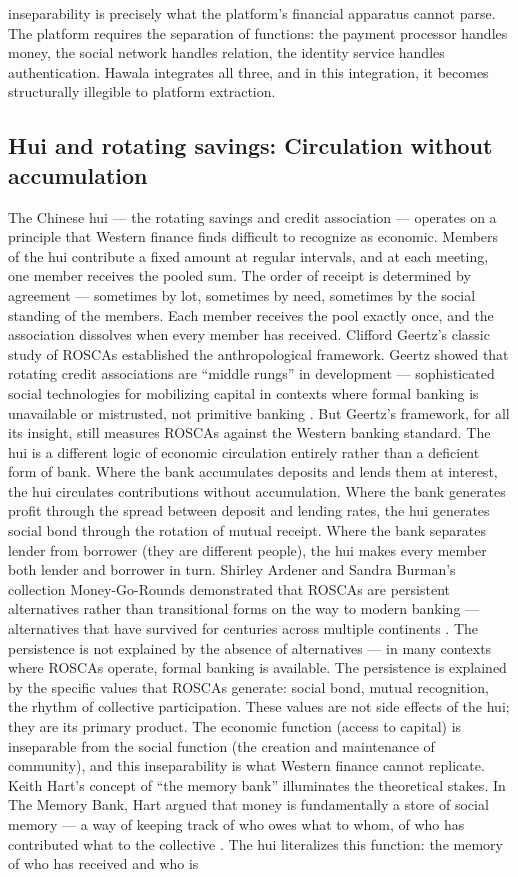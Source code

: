 inseparability is precisely what the platform’s financial apparatus cannot parse. The platform requires the separation of functions: the payment processor handles money, the social network handles relation, the identity service handles authentication. Hawala integrates all three, and in this integration, it becomes structurally illegible to platform extraction.

\subsection{Hui and rotating savings: Circulation without accumulation}

The Chinese hui — the rotating savings and credit association — operates on a principle that Western finance finds difficult to recognize as economic. Members of the hui contribute a fixed amount at regular intervals, and at each meeting, one member receives the pooled sum. The order of receipt is determined by agreement — sometimes by lot, sometimes by need, sometimes by the social standing of the members. Each member receives the pool exactly once, and the association dissolves when every member has received. Clifford Geertz’s classic study of ROSCAs established the anthropological framework. Geertz showed that rotating credit associations are “middle rungs” in development — sophisticated social technologies for mobilizing capital in contexts where formal banking is unavailable or mistrusted, not primitive banking \cite{geertz_1962}. But Geertz’s framework, for all its insight, still measures ROSCAs against the Western banking standard. The hui is a different logic of economic circulation entirely rather than a deficient form of bank. Where the bank accumulates deposits and lends them at interest, the hui circulates contributions without accumulation. Where the bank generates profit through the spread between deposit and lending rates, the hui generates social bond through the rotation of mutual receipt. Where the bank separates lender from borrower (they are different people), the hui makes every member both lender and borrower in turn. Shirley Ardener and Sandra Burman’s collection Money-Go-Rounds demonstrated that ROSCAs are persistent alternatives rather than transitional forms on the way to modern banking — alternatives that have survived for centuries across multiple continents \cite{ardener_burman_1995}. The persistence is not explained by the absence of alternatives — in many contexts where ROSCAs operate, formal banking is available. The persistence is explained by the specific values that ROSCAs generate: social bond, mutual recognition, the rhythm of collective participation. These values are not side effects of the hui; they are its primary product. The economic function (access to capital) is inseparable from the social function (the creation and maintenance of community), and this inseparability is what Western finance cannot replicate. Keith Hart’s concept of “the memory bank” illuminates the theoretical stakes. In The Memory Bank, Hart argued that money is fundamentally a store of social memory — a way of keeping track of who owes what to whom, of who has contributed what to the collective \cite{hart_2000}. The hui literalizes this function: the memory of who has received and who is 